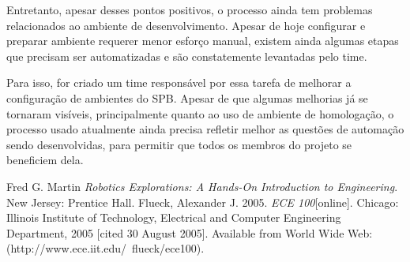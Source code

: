 \documentclass[a4paper, 11pt]{article}
\begin{document}
Entretanto, apesar desses pontos positivos, o processo ainda tem problemas
relacionados ao ambiente de desenvolvimento. Apesar de hoje configurar e
preparar ambiente requerer menor esforço manual, existem ainda algumas etapas
que precisam ser automatizadas e são constatemente levantadas pelo time.

Para isso, for criado um time responsável por essa tarefa de melhorar a
configuração de ambientes do SPB. Apesar de que algumas melhorias já se
tornaram visíveis, principalmente quanto ao uso de ambiente de homologação, o
processo usado atualmente ainda precisa refletir melhor as questões de
automação sendo desenvolvidas, para permitir que todos os membros do projeto
se beneficiem dela.

\begin{thebibliography}{9}
 Fred G. Martin \emph{Robotics Explorations: A Hands-On
Introduction to Engineering}. New Jersey: Prentice Hall.
  Flueck, Alexander J. 2005. \emph{ECE 100}[online]. Chicago:
Illinois Institute of Technology, Electrical and Computer Engineering
Department, 2005 [cited 30
August 2005]. Available from World Wide Web:
(http://www.ece.iit.edu/~flueck/ece100).
\end{thebibliography}
\end{document}
